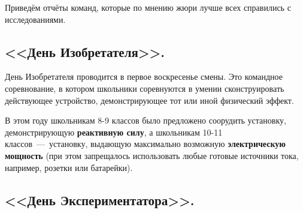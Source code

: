 \documentclass[12pt,a4paper,oneside]{scrartcl}
\newlength{\h}
\newlength{\x}
\begin{document}
Приведём отчёты команд, которые по мнению жюри лучше всех справились с
исследованиями.

\clearpage


\clearpage

\vspace{1cm}



\clearpage
\subsection{<<День Изобретателя>>.}
\label{sec:day_inventor}

День Изобретателя проводится в первое воскресенье смены. Это командное
соревнование, в котором школьники соревнуются в умении сконструировать
действующее устройство, демонстрирующее тот или иной физический
эффект. 

В этом году школьникам 8-9 классов было предложено соорудить
установку, демонстрирующую \textbf{реактивную силу}, а школьникам
10-11 классов~---~установку, выдающую максимально возможную
\textbf{электрическую мощность} (при этом запрещалось использовать
любые готовые источники тока, например, розетки или батарейки). 

\begin{figure}[h]
  \centering
  \hspace{0.05\textwidth}
  \hspace{0.05\textwidth}
\end{figure}

\begin{figure}[h]
  \centering
  \hspace{0.05\textwidth}
\end{figure}

\clearpage
\subsection{<<День Экспериментатора>>.}
\label{sec:day_exp}

\begin{figure}[h]
  \centering
  \hspace{0.05\textwidth}
\end{figure}
\end{document}
